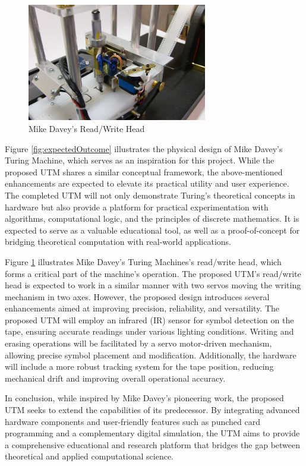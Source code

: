 \begin{figure}[h!]
    \centering
    \includegraphics[width=0.7\textwidth]{content/images/mikeDaveyRW.jpg}
    \caption{Mike Davey’s Read/Write Head}
    \label{fig:mikeDaveyRW}
\end{figure}

Figure \ref{fig:expectedOutcome} illustrates the physical design of Mike Davey's Turing Machine, which serves as an inspiration for this project. While the proposed UTM shares a similar conceptual framework, the above-mentioned enhancements are expected to elevate its practical utility and user experience. The completed UTM will not only demonstrate Turing's theoretical concepts in hardware but also provide a platform for practical experimentation with algorithms, computational logic, and the principles of discrete mathematics. It is expected to serve as a valuable educational tool, as well as a proof-of-concept for bridging theoretical computation with real-world applications.

Figure \ref{fig:mikeDaveyRW} illustrates Mike Davey’s Turing Machines's read/write head, which forms a critical part of the machine’s operation. The proposed UTM’s read/write head is expected to work in a similar manner with two servos moving the writing mechanism in two axes. However, the proposed design introduces several enhancements aimed at improving precision, reliability, and versatility. The proposed UTM will employ an infrared (IR) sensor for symbol detection on the tape, ensuring accurate readings under various lighting conditions. Writing and erasing operations will be facilitated by a servo motor-driven mechanism, allowing precise symbol placement and modification. Additionally, the hardware will include a more robust tracking system for the tape position, reducing mechanical drift and improving overall operational accuracy.

In conclusion, while inspired by Mike Davey’s pioneering work, the proposed UTM seeks to extend the capabilities of its predecessor. By integrating advanced hardware components and user-friendly features such as punched card programming and a complementary digital simulation, the UTM aims to provide a comprehensive educational and research platform that bridges the gap between theoretical and applied computational science.








